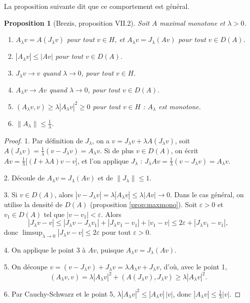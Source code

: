 \documentclass[11pt,a4paper]{article}
\theoremstyle{plain}
\newtheorem{proposition}[theoreme]{Proposition}
\theoremstyle{definition}
\theoremstyle{remark}
\begin{document}
La proposition suivante dit que ce comportement est général.

\begin{proposition}[Brezis, proposition VII.2]\label{prop:yosida}
Soit $A$ maximal monotone et $\lambda>0$.
\begin{enumerate}[nosep]
\item $A_\lambda v=A(J_\lambda v)$ pour tout $v\in H$, et $A_\lambda v=J_\lambda(Av)$ pour tout $v\in D(A)$.
\item $|A_\lambda v|\leq|Av|$ pour tout $v\in D(A)$.
\item $J_\lambda v\to v$ quand $\lambda\to0$, pour tout $v\in H$.
\item $A_\lambda v\to Av$ quand $\lambda\to0$, pour tout $v\in D(A)$.
\item $(A_\lambda v,v)\geq\lambda|A_\lambda v|^2\geq0$ pour tout $v\in H$ : $A_\lambda$ est monotone.
\item $\|A_\lambda\|\leq\frac1\lambda$.
\end{enumerate}
\end{proposition}

\begin{proof}
1. Par définition de $J_\lambda$, on a $v=J_\lambda v+\lambda A(J_\lambda v)$, soit $A(J_\lambda v)=\frac1\lambda(v-J_\lambda v)=A_\lambda v$. Si de plus $v\in D(A)$, on écrit $Av=\frac1\lambda\big[(I+\lambda A)v-v\big]$, et l'on applique $J_\lambda$ : $J_\lambda Av=\frac1\lambda(v-J_\lambda v)=A_\lambda v$.

2. Découle de $A_\lambda v=J_\lambda(Av)$ et de $\|J_\lambda\|\leq1$.

3. Si $v\in D(A)$, alors $|v-J_\lambda v|=\lambda|A_\lambda v|\leq\lambda|Av|\to0$. Dans le cas général, on utilise la densité de $D(A)$ (proposition \ref{prop:maxmono}). Soit $\varepsilon>0$ et $v_1\in D(A)$ tel que $|v-v_1|<\varepsilon$. Alors
\[
  |J_\lambda v-v|\leq|J_\lambda v-J_\lambda v_1|+|J_\lambda v_1-v_1|+|v_1-v|\leq2\varepsilon+|J_\lambda v_1-v_1| ,
\]
donc $\limsup_{\lambda\to0}|J_\lambda v-v|\leq2\varepsilon$ pour tout $\varepsilon>0$.

4. On applique le point 3 à $Av$, puisque $A_\lambda v=J_\lambda(Av)$.

5. On découpe $v=(v-J_\lambda v)+J_\lambda v=\lambda A_\lambda v+J_\lambda v$, d'où, avec le point 1,
\[
  (A_\lambda v,v)=\lambda|A_\lambda v|^2+(A(J_\lambda v),J_\lambda v)\geq\lambda|A_\lambda v|^2 .
\]

6. Par Cauchy-Schwarz et le point 5, $\lambda|A_\lambda v|^2\leq|A_\lambda v|\,|v|$, donc $|A_\lambda v|\leq\frac1\lambda|v|$.
\end{proof}
\end{document}
